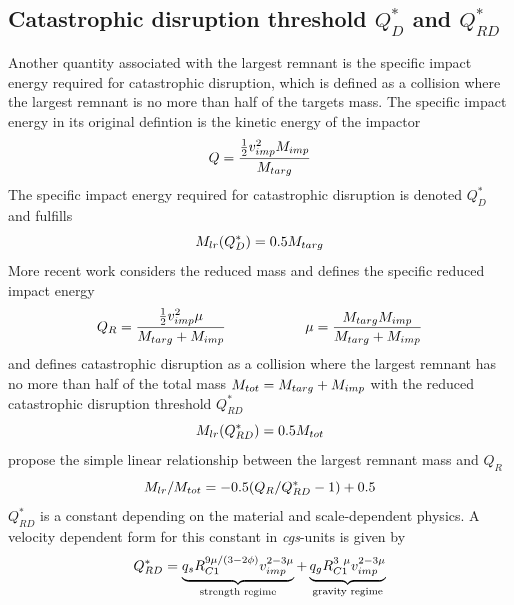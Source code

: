 \subsection{Catastrophic disruption threshold $Q^*_D$ and $Q^*_{RD}$}
Another quantity associated with the largest remnant is the specific impact energy required for catastrophic disruption, which is defined as a collision where the largest remnant is no more than half of the targets mass. The specific impact energy in its original defintion \cite{Benz1999Icar..142....5B} is the kinetic energy of the impactor 
\begin{equation}
Q = \frac{ \frac{1}{2} v_{imp}^2 M_{imp} }{M_{targ}} 
\end{equation}
The specific impact energy required for catastrophic disruption is denoted $Q^*_D$ and fulfills
\begin{equation}
M_{lr}(Q^*_D) = 0.5 M_{targ}
\end{equation}
More recent work \citep{Stewart:2009p3265, 2009ApJ...700L.118M, 2010ApJ...712L..73M, Leinhardt:2011p4060} considers the reduced mass and defines the specific reduced impact energy 
\begin{equation}
\label{ch03_eq005}
Q_R = \frac{ \frac{1}{2} v_{imp}^2 \mu }{M_{targ} + M_{imp}} \hspace{2.0cm} \mu = \frac{M_{targ} M_{imp}}{M_{targ} + M_{imp}} 
\end{equation}
and defines catastrophic disruption as a collision where the largest remnant has no more than half of the total mass $M_{tot} = M_{targ} + M_{imp}$ with the reduced catastrophic disruption threshold $Q^*_{RD}$
\begin{equation}
M_{lr}(Q^*_{RD}) = 0.5 M_{tot}
\end{equation}
\cite{Stewart:2009p3265} propose the simple linear relationship between the largest remnant mass and $Q_R$
\begin{equation}
\label{ch03_eq003}
M_{lr} / M_{tot} = - 0.5 ( Q_R / Q^*_{RD} - 1 ) + 0.5
\end{equation}
$Q^*_{RD}$ is a constant depending on the material and scale-dependent physics. A velocity dependent form for this constant in \emph{cgs}-units is given by
\begin{equation}
\label{ch03_eq004}
Q^*_{RD} = \underbrace{ q_s R^{9\mu/(3-2\phi)}_{C1} \vimp^{2-3\mu} }_{\textrm{strength regime} } + \underbrace{ q_g R^{3 \mu}_{C1} \vimp^{2-3\mu}}_{\textrm{gravity regime}}
\end{equation}
